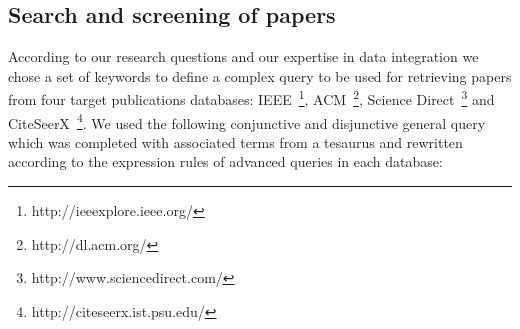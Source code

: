 \subsection{Search and screening of papers} \label{subsec:search}

According to our research questions and our expertise in data integration we chose a set of keywords to define a complex query to be used for retrieving papers from four target publications databases: IEEE~\footnote{http://ieeexplore.ieee.org/},
ACM~\footnote{http://dl.acm.org/}, Science Direct~\footnote{http://www.sciencedirect.com/} and
CiteSeerX~\footnote{http://citeseerx.ist.psu.edu/}. We used the following conjunctive and disjunctive general query which was completed with associated terms from a tesaurus and rewritten according to the expression rules of advanced queries in each database: 



\medskip

